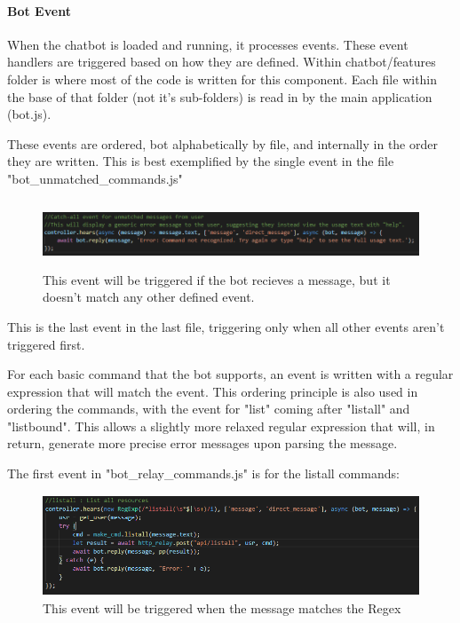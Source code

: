 \documentclass[onecolumn, draftclsnofoot,10pt, compsoc]{IEEEtran}
\begin{document}
    \paragraph{Bot Event}
    When the chatbot is loaded and running, it processes events.
    These event handlers are triggered based on how they are defined.
    Within chatbot/features folder is where most of the code is written for this component.
    Each file within the base of that folder (not it's sub-folders) is read in by the main application (bot.js).
    
    These events are ordered, bot alphabetically by file, and internally in the order they are written.
    This is best exemplified by the single event in the file "bot\_unmatched\_commands.js"
    \begin{figure}[ht]
        \centering
        \includegraphics[height=2cm]{code1.png}
        \caption[Unmatched Bot Event]{This event will be triggered if the bot recieves a message, but it doesn't match any other defined event.}
        \label{fig:Unmatched Bot Event}
    \end{figure}
    
    This is the last event in the last file, triggering only when all other events aren't triggered first.
    
    For each basic command that the bot supports, an event is written with a regular expression that will match the event.
    This ordering principle is also used in ordering the commands, with the event for "list" coming after "listall" and "listbound".
    This allows a slightly more relaxed regular expression that will, in return, generate more precise error messages upon parsing the message.
    
    The first event in "bot\_relay\_commands.js" is for the listall commands:
    \begin{figure}[ht]
        \centering
        \includegraphics[height=3cm]{code2.png}
        \caption[Event For listall]{This event will be triggered when the message matches the Regex}
        \label{fig:Event For listall}
    \end{figure}
\end{document}
